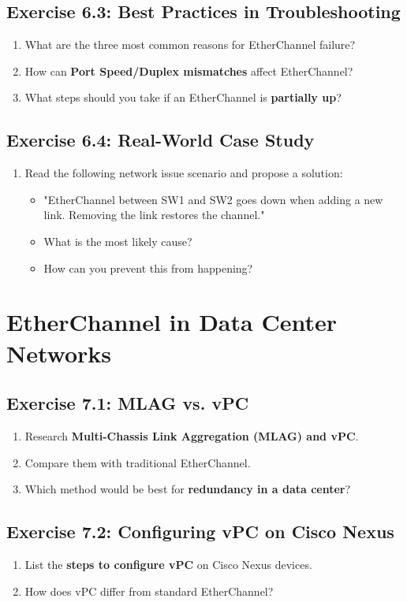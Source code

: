 \documentclass[a4paper]{article}
\begin{document}
\subsection{Exercise 6.3: Best Practices in Troubleshooting}
\begin{enumerate}
    \item What are the three most common reasons for EtherChannel failure?
    \item How can \textbf{Port Speed/Duplex mismatches} affect EtherChannel?
    \item What steps should you take if an EtherChannel is \textbf{partially up}?
\end{enumerate}

\subsection{Exercise 6.4: Real-World Case Study}
\begin{enumerate}
    \item Read the following network issue scenario and propose a solution:
    \begin{itemize}
        \item "EtherChannel between SW1 and SW2 goes down when adding a new link. Removing the link restores the channel."
        \item What is the most likely cause?
        \item How can you prevent this from happening?
    \end{itemize}
\end{enumerate}

\section{EtherChannel in Data Center Networks}
\subsection{Exercise 7.1: MLAG vs. vPC}
\begin{enumerate}
    \item Research \textbf{Multi-Chassis Link Aggregation (MLAG) and vPC}.
    \item Compare them with traditional EtherChannel.
    \item Which method would be best for \textbf{redundancy in a data center}?
\end{enumerate}

\subsection{Exercise 7.2: Configuring vPC on Cisco Nexus}
\begin{enumerate}
    \item List the \textbf{steps to configure vPC} on Cisco Nexus devices.
    \item How does vPC differ from standard EtherChannel?
\end{enumerate}
\end{document}
